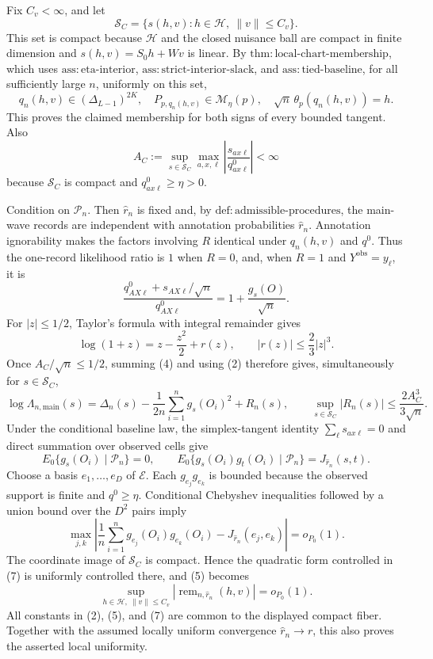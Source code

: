 Fix \(C_v<\infty\), and let
\[
 \mathcal S_C=\{s(h,v):h\in\mathcal H,\ \lVert v\rVert\leq C_v\}.
\]
This set is compact because \(\mathcal H\) and the closed nuisance ball are compact in finite dimension and \(s(h,v)=S_0h+Wv\) is linear.  By \(\mathrm{thm:local\text{-}chart\text{-}membership}\), which uses \(\mathrm{ass:eta\text{-}interior}\), \(\mathrm{ass:strict\text{-}interior\text{-}slack}\), and \(\mathrm{ass:tied\text{-}baseline}\), for all sufficiently large \(n\), uniformly on this set,
\[
 q_n(h,v)\in(\Delta_{L-1})^{2K},\quad
 P_{p,q_n(h,v)}\in\mathcal M_\eta(p),\quad
 \sqrt n\,\theta_p(q_n(h,v))=h.                                     \tag{1}
\]
This proves the claimed membership for both signs of every bounded tangent.  Also
\[
 A_C:=\sup_{s\in\mathcal S_C}\max_{a,x,\ell}
 \left|\frac{s_{ax\ell}}{q^0_{ax\ell}}\right|<\infty                 \tag{2}
\]
because \(\mathcal S_C\) is compact and \(q^0_{ax\ell}\geq\eta>0\).

Condition on \(\mathscr P_n\).  Then \(\widehat r_n\) is fixed and, by \(\mathrm{def:admissible\text{-}procedures}\), the main-wave records are independent with annotation probabilities \(\widehat r_n\).  Annotation ignorability makes the factors involving \(R\) identical under \(q_n(h,v)\) and \(q^0\).  Thus the one-record likelihood ratio is \(1\) when \(R=0\), and, when \(R=1\) and \(Y^{\mathrm{obs}}=y_\ell\), it is
\[
 \frac{q^0_{AX\ell}+s_{AX\ell}/\sqrt n}{q^0_{AX\ell}}
 =1+\frac{g_s(O)}{\sqrt n}.                                         \tag{3}
\]
For \(|z|\leq1/2\), Taylor's formula with integral remainder gives
\[
 \log(1+z)=z-\frac{z^2}{2}+r(z),\qquad |r(z)|\leq\frac23|z|^3.       \tag{4}
\]
Once \(A_C/\sqrt n\leq1/2\), summing (4) and using (2) therefore gives, simultaneously for \(s\in\mathcal S_C\),
\[
 \log\Lambda_{n,\mathrm{main}}(s)
 =\Delta_n(s)-\frac1{2n}\sum_{i=1}^ng_s(O_i)^2+R_n(s),\qquad
 \sup_{s\in\mathcal S_C}|R_n(s)|\leq\frac{2A_C^3}{3\sqrt n}.       \tag{5}
\]
Under the conditional baseline law, the simplex-tangent identity \(\sum_\ell s_{ax\ell}=0\) and direct summation over observed cells give
\[
 E_0\{g_s(O_i)\mid\mathscr P_n\}=0,\qquad
 E_0\{g_s(O_i)g_t(O_i)\mid\mathscr P_n\}=J_{\widehat r_n}(s,t).     \tag{6}
\]
Choose a basis \(e_1,\ldots,e_D\) of \(\mathcal E\).  Each \(g_{e_j}g_{e_k}\) is bounded because the observed support is finite and \(q^0\geq\eta\).  Conditional Chebyshev inequalities followed by a union bound over the \(D^2\) pairs imply
\[
 \max_{j,k}\left|\frac1n\sum_{i=1}^ng_{e_j}(O_i)g_{e_k}(O_i)
 -J_{\widehat r_n}(e_j,e_k)\right|=o_{P_0}(1).                       \tag{7}
\]
The coordinate image of \(\mathcal S_C\) is compact.  Hence the quadratic form controlled in (7) is uniformly controlled there, and (5) becomes
\[
 \sup_{h\in\mathcal H,\ \lVert v\rVert\leq C_v}
 |\operatorname{rem}_{n,\widehat r_n}(h,v)|=o_{P_0}(1).              \tag{8}
\]
All constants in (2), (5), and (7) are common to the displayed compact fiber.  Together with the assumed locally uniform convergence \(\widehat r_n\to r\), this also proves the asserted local uniformity.

